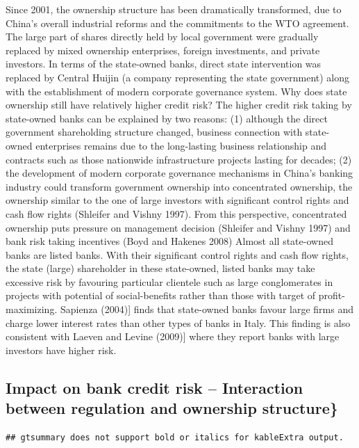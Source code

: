 \documentclass{article}
\begin{document}
Since 2001, the ownership structure has been dramatically transformed,
due to China's overall industrial reforms and the commitments to the WTO
agreement. The large part of shares directly held by local government
were gradually replaced by mixed ownership enterprises, foreign
investments, and private investors. In terms of the state-owned banks,
direct state intervention was replaced by Central Huijin (a company
representing the state government) along with the establishment of
modern corporate governance system. Why does state ownership still have
relatively higher credit risk? The higher credit risk taking by
state-owned banks can be explained by two reasons: (1) although the
direct government shareholding structure changed, business connection
with state-owned enterprises remains due to the long-lasting business
relationship and contracts such as those nationwide infrastructure
projects lasting for decades; (2) the development of modern corporate
governance mechanisms in China's banking industry could transform
government ownership into concentrated ownership, the ownership similar
to the one of large investors with significant control rights and cash
flow rights (Shleifer and Vishny 1997). From this perspective,
concentrated ownership puts pressure on management decision (Shleifer
and Vishny 1997) and bank risk taking incentives (Boyd and Hakenes 2008)
Almost all state-owned banks are listed banks. With their significant
control rights and cash flow rights, the state (large) shareholder in
these state-owned, listed banks may take excessive risk by favouring
particular clientele such as large conglomerates in projects with
potential of social-benefits rather than those with target of
profit-maximizing. Sapienza (2004){]} finds that state-owned banks
favour large firms and charge lower interest rates than other types of
banks in Italy. This finding is also consistent with Laeven and Levine
(2009){]} where they report banks with large investors have higher risk.

\hypertarget{impact-on-bank-credit-risk-interaction-between-regulation-and-ownership-structure}{%
\subsection{Impact on bank credit risk -- Interaction between regulation
and ownership
structure\}}\label{impact-on-bank-credit-risk-interaction-between-regulation-and-ownership-structure}}

\begin{verbatim}
## gtsummary does not support bold or italics for kableExtra output.
\end{verbatim}
\end{document}
